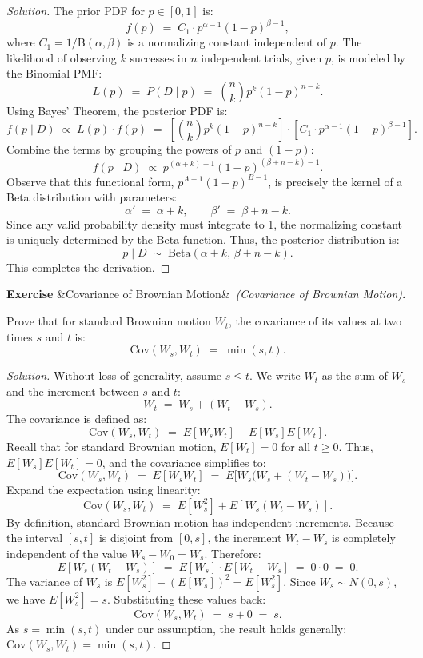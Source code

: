 \documentclass[12pt, a4paper]{article}
\newcounter{exercise}
\newenvironment{exercise}[1][]{%
  \refstepcounter{exercise}%
  \par\vspace{6pt}%
  \noindent\textbf{\color{Gold}Exercise \theexercise}%
  \ifx&#1&\else\ \textit{(#1)}\fi\textbf{.}\enskip
}{\par\vspace{4pt}}
\begin{document}
\begin{proof}[Solution]
The prior PDF for $p \in [0, 1]$ is:
\[
  f(p) \;=\; C_1 \cdot p^{\alpha-1} (1-p)^{\beta-1},
\]
where $C_1 = 1/\text{B}(\alpha, \beta)$ is a normalizing constant independent of $p$.
The likelihood of observing $k$ successes in $n$ independent trials, given $p$, is modeled by the Binomial PMF:
\[
  L(p) \;=\; P(D \mid p) \;=\; \binom{n}{k} p^k (1-p)^{n-k}.
\]
Using Bayes' Theorem, the posterior PDF is:
\[
  f(p \mid D) \;\propto\; L(p) \cdot f(p) \;=\; \left[ \binom{n}{k} p^k (1-p)^{n-k} \right] \cdot \left[ C_1 \cdot p^{\alpha-1} (1-p)^{\beta-1} \right].
\]
Combine the terms by grouping the powers of $p$ and $(1-p)$:
\[
  f(p \mid D) \;\propto\; p^{(\alpha + k) - 1} (1-p)^{(\beta + n - k) - 1}.
\]
Observe that this functional form, $p^{A-1}(1-p)^{B-1}$, is precisely the kernel of a Beta distribution with parameters:
\[
  \alpha' \;=\; \alpha + k, \qquad \beta' \;=\; \beta + n - k.
\]
Since any valid probability density must integrate to 1, the normalizing constant is uniquely determined by the Beta function. Thus, the posterior distribution is:
\[
  p \mid D \;\sim\; \text{Beta}(\alpha + k, \, \beta + n - k).
\]
This completes the derivation.
\end{proof}

\begin{exercise}[Covariance of Brownian Motion]
Prove that for standard Brownian motion $W_t$, the covariance of its values at two times $s$ and $t$ is:
\[
  \text{Cov}(W_s, W_t) \;=\; \min(s, t).
\]
\end{exercise}

\begin{proof}[Solution]
Without loss of generality, assume $s \le t$.
We write $W_t$ as the sum of $W_s$ and the increment between $s$ and $t$:
\[
  W_t \;=\; W_s + (W_t - W_s).
\]
The covariance is defined as:
\[
  \text{Cov}(W_s, W_t) \;=\; E[W_s W_t] - E[W_s]E[W_t].
\]
Recall that for standard Brownian motion, $E[W_t] = 0$ for all $t \ge 0$. Thus, $E[W_s]E[W_t] = 0$, and the covariance simplifies to:
\[
  \text{Cov}(W_s, W_t) \;=\; E[W_s W_t] \;=\; E\bigl[ W_s \bigl( W_s + (W_t - W_s) \bigr) \bigr].
\]
Expand the expectation using linearity:
\[
  \text{Cov}(W_s, W_t) \;=\; E[W_s^2] + E[W_s(W_t - W_s)].
\]
By definition, standard Brownian motion has independent increments. Because the interval $[s, t]$ is disjoint from $[0, s]$, the increment $W_t - W_s$ is completely independent of the value $W_s - W_0 = W_s$. Therefore:
\[
  E[W_s(W_t - W_s)] \;=\; E[W_s] \cdot E[W_t - W_s] \;=\; 0 \cdot 0 \;=\; 0.
\]
The variance of $W_s$ is $E[W_s^2] - (E[W_s])^2 = E[W_s^2]$. Since $W_s \sim N(0, s)$, we have $E[W_s^2] = s$.
Substituting these values back:
\[
  \text{Cov}(W_s, W_t) \;=\; s + 0 \;=\; s.
\]
As $s = \min(s, t)$ under our assumption, the result holds generally: $\text{Cov}(W_s, W_t) = \min(s, t)$.
\end{proof}
\end{document}
